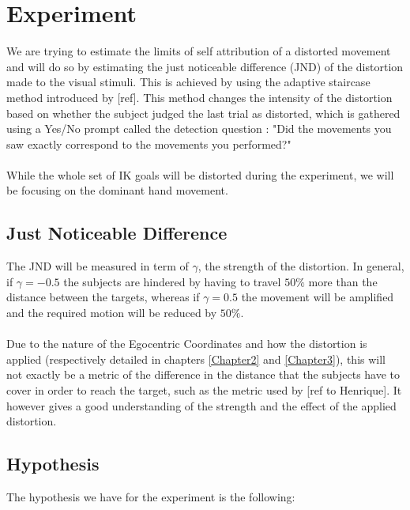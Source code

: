 
\chapter{Experiment} %

\label{Chapter4} %

We are trying to estimate the limits of self attribution of a distorted movement and will do so by estimating the just noticeable difference (JND) of the distortion made to the visual stimuli. This is achieved by using the adaptive staircase method introduced by [ref]. This method changes the intensity of the distortion based on whether the subject judged the last trial as distorted, which is gathered using a Yes/No prompt called the detection question : "Did the movements you saw exactly correspond to the movements you performed?"
\\\\
While the whole set of IK goals will be distorted during the experiment, we will be focusing on the dominant hand movement.

\section{Just Noticeable Difference}

The JND will be measured in term of $\gamma$, the strength of the distortion. In general, if $\gamma = -0.5$ the subjects are hindered by having to travel $50\%$ more than the distance between the targets, whereas if $\gamma = 0.5$ the movement will be amplified and the required motion will be reduced by $50\%$.
\\\\
Due to the nature of the Egocentric Coordinates and how the distortion is applied (respectively detailed in chapters \ref{Chapter2} and \ref{Chapter3}), this will not exactly be a metric of the difference in the distance that the subjects have to cover in order to reach the target, such as the metric used by [ref to Henrique]. It however gives a good understanding of the strength and the effect of the applied distortion.

\section{Hypothesis}

The hypothesis we have for the experiment is the following:

